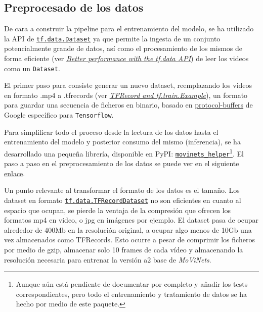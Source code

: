 \subsection{Preprocesado de los datos}

De cara a construir la pipeline para el entrenamiento del modelo, se ha utilizado la API de \href{https://www.tensorflow.org/api_docs/python/tf/data/Dataset}{\texttt{tf.data.Dataset}} ya que permite la ingesta de un conjunto potencialmente grande de datos, así como el procesamiento de los mismos de forma eficiente (ver \href{https://www.tensorflow.org/guide/data_performance}{\textit{Better performance with the tf.data API}}) de leer los videos como un \texttt{Dataset}.

El primer paso para consiste generar un nuevo dataset, reemplazando los videos en formato .mp4 a .tfrecords (ver \href{https://www.tensorflow.org/tutorials/load_data/tfrecord}{\textit{TFRecord and tf.train.Example}}), un formato para guardar una secuencia de ficheros en binario, basado en \href{https://developers.google.com/protocol-buffers/}{protocol-buffers} de Google específico para \texttt{Tensorflow}.

Para simplificar todo el proceso desde la lectura de los datos hasta el entrenamiento del modelo y posterior consumo del mismo (inferencia), se ha desarrollado una pequeña librería, disponible en PyPI: \href{https://pypi.org/project/movinets_helper/}{\texttt{movinets\_helper}}\footnote{Aunque aún está pendiente de documentar por completo y añadir los tests correspondientes, pero todo el entrenamiento y tratamiento de datos se ha hecho por medio de este paquete.}. El paso a paso en el preprocesamiento de los datos se puede ver en el siguiente \href{https://plaguss.github.io/movinets_helper/how-to-guides/#how-to-create-a-dataset}{enlace}.

Un punto relevante al transformar el formato de los datos es el tamaño. Los dataset en formato \href{https://www.tensorflow.org/api_docs/python/tf/data/TFRecordDataset}{\texttt{tf.data.TFRecordDataset}} no son eficientes en cuanto al espacio que ocupan, se pierde la ventaja de la compresión que ofrecen los formatos mp4 en video, o jpg en imágenes por ejemplo. El dataset pasa de ocupar alrededor de 400Mb en la resolución original, a ocupar algo menos de 10Gb una vez almacenados como TFRecords. Esto ocurre a pesar de comprimir los ficheros por medio de gzip, almacenar solo 10 frames de cada vídeo y almacenando la resolución necesaria para entrenar la versión a2 base de \textit{MoViNets}.

